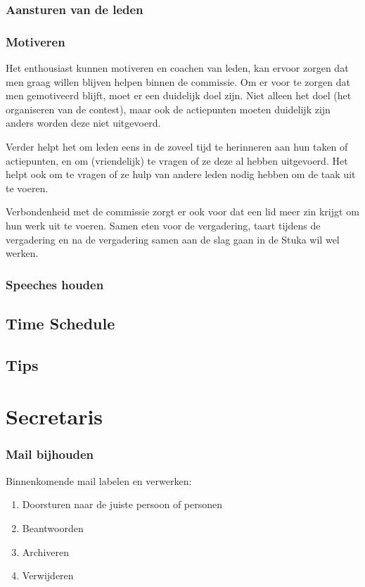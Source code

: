 	\subsubsection{Aansturen van de leden}
		
	\subsubsection{Motiveren}\label{Motiveren}
	Het enthousiast kunnen motiveren en coachen van leden, kan ervoor zorgen dat men graag willen blijven helpen binnen de commissie. Om er voor te zorgen dat men gemotiveerd blijft, moet er een duidelijk doel zijn. Niet alleen het doel (het organiseren van de contest), maar ook de actiepunten moeten duidelijk zijn anders worden deze niet uitgevoerd.
	
	Verder helpt het om leden eens in de zoveel tijd te herinneren aan hun taken of actiepunten, en om (vriendelijk) te vragen of ze deze al hebben uitgevoerd. Het helpt ook om te vragen of ze hulp van andere leden nodig hebben om de taak uit te voeren.
	
	Verbondenheid met de commissie zorgt er ook voor dat een lid meer zin krijgt om hun werk uit te voeren. Samen eten voor de vergadering, taart tijdens de vergadering en na de vergadering samen aan de slag gaan in de Stuka wil wel werken.
	
	\subsubsection{Speeches houden}
	
	\subsection{Time Schedule}
	
	\subsection{Tips}
	
\section{Secretaris}
	\subsubsection{Mail bijhouden}
	Binnenkomende mail labelen en verwerken:
	\begin{enumerate}
	\item Doorsturen naar de juiste persoon of personen
	\item Beantwoorden
	\item Archiveren 
	\item Verwijderen	
	\end{enumerate}	
	
